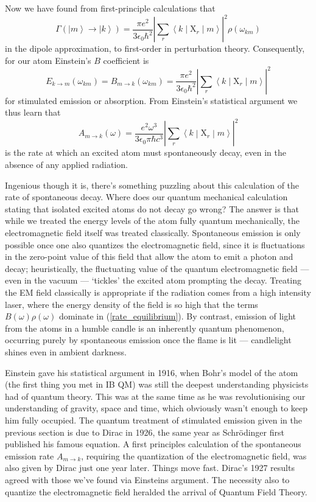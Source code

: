\documentclass{article}
\theoremstyle{plain}\theoremheaderfont{\normalfont\itshape}\theorembodyfont{\rmfamily}\theoremseparator{.}\newtheorem*{rem}{Remark}\newtheorem*{ex}{Example}\newtheorem*{proof}{Proof}\newtheorem*{altp}{Alternative proof}
\theoremstyle{plain}\theoremheaderfont{\normalfont\bfseries}\theorembodyfont{\rmfamily}\theoremseparator{.}\newtheorem{thm}{Theorem}[section]\newtheorem{lem}[thm]{Lemma}\newtheorem{prop}[thm]{Proposition}\newtheorem*{cor}{Corollary}\newtheorem{defn}[thm]{Definition}\newtheorem{clm}[thm]{Claim}\newtheorem{clminproof}{Claim}
\theoremstyle{break}\theoremheaderfont{\normalfont\itshape}\theorembodyfont{\rmfamily}\theoremseparator{.\medskip}\newtheorem*{proofskip}{Proof}\newtheorem*{exs}{Examples}\newtheorem*{rems}{Remarks}
\theoremstyle{break}\theoremheaderfont{\normalfont\bfseries}\theorembodyfont{\rmfamily}\theoremseparator{.\medskip}\newtheorem{lemskip}[thm]{Lemma}\newtheorem{defnskip}[thm]{Definition}\newtheorem{propskip}[thm]{Proposition}\newtheorem{thmskip}[thm]{Theorem}
\numberwithin{equation}{section}
\newcommand{\ket}[1]{\left| #1 \right\rangle}
\newcommand{\mel}[3]{\left\langle #1 \middle| #2 \middle| #3 \right\rangle}
\newcommand{\vb}[1]{\bm{\mathrm{#1}}}
\newcommand{\abs}[1]{\left| #1 \right|}
\begin{document}
    Now we have found from first-principle calculations that
    \begin{equation}
        \Gamma(\ket{m}\to\ket{k})=\frac{\pi e^2}{3\epsilon_0\hbar^2}\abs{\sum_r\mel{k}{\vb{X}_r}{m}}^2\rho(\omega_{km})
    \end{equation}
    in the dipole approximation, to first-order in perturbation theory. Consequently, for our atom Einstein's \(B\) coefficient is
    \begin{equation}
        E_{k\to m}(\omega_{km})=B_{m\to k}(\omega_{km})=\frac{\pi e^2}{3\epsilon_0\hbar^2}\abs{\sum_r\mel{k}{\vb{X}_r}{m}}^2
    \end{equation}
    for stimulated emission or absorption. From Einstein's statistical argument we thus learn that
    \begin{equation}\label{Einstein_A_coeff}
        A_{m\to k}(\omega)=\frac{e^2\omega^3}{3\epsilon_0\pi\hbar c^3}\abs{\sum_r\mel{k}{\vb{X}_r}{m}}^2
    \end{equation}
    is the rate at which an excited atom must spontaneously decay, even in the absence of any applied radiation.

    Ingenious though it is, there's something puzzling about this calculation of the rate of spontaneous decay. Where does our quantum mechanical calculation stating that isolated excited atoms do not decay go wrong? The answer is that while we treated the energy levels of the atom fully quantum mechanically, the electromagnetic field itself was treated classically. Spontaneous emission is only possible once one also quantizes the electromagnetic field, since it is fluctuations in the zero-point value of this field that allow the atom to emit a photon and decay; heuristically, the fluctuating value of the quantum electromagnetic field --- even in the vacuum --- `tickles' the excited atom prompting the decay. Treating the EM field classically is appropriate if the radiation comes from a high intensity laser, where the energy density of the field is so high that the terms \(B(\omega)\rho(\omega)\) dominate in (\ref{rate_equilibrium}). By contrast, emission of light from the atoms in a humble candle is an inherently quantum phenomenon, occurring purely by spontaneous emission once the flame is lit --- candlelight shines even in ambient darkness.

    Einstein gave his statistical argument in 1916, when Bohr's model of the atom (the first thing you met in IB QM) was still the deepest understanding physicists had of quantum theory. This was at the same time as he was revolutionising our understanding of gravity, space and time, which obviously wasn't enough to keep him fully occupied. The quantum treatment of stimulated emission given in the previous section is due to Dirac in 1926, the same year as Schr\"{o}dinger first published his famous equation. A first principles calculation of the spontaneous emission rate \(A_{m\to k}\), requiring the quantization of the electromagnetic field, was also given by Dirac just one year later. Things move fast. Dirac's 1927 results agreed with those we've found via Einsteins argument. The necessity also to quantize the electromagnetic field heralded the arrival of Quantum Field Theory.
\end{document}
